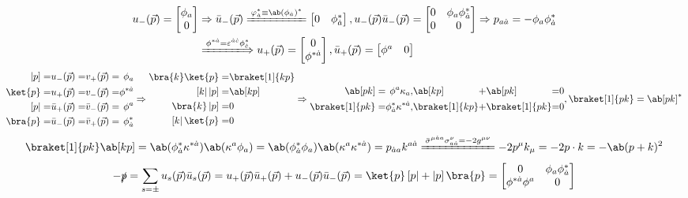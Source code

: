 \documentclass{article}
\newcommand{\bmat}[1]{\begin{bmatrix}#1\end{bmatrix}}
\newcommand{\gmunu}{g^{\mu\nu}}
\newcommand{\slashedp}{\slashed{p}}
\newcommand{\xleq}{\xlongequal}
\begin{document}
\begin{align*}
    u_{-}(\vec{p}) = \bmat{\phi_a                                                                                  \\ 0} & \Rightarrow \bar{u}_{-}(\vec{p}) \xleq{\varphi^*_{\dot{a}} \equiv \ab(\phi_{\dot{a}})^*} \bmat{0 & \phi^*_{\dot{a}}}, u_{-}(\vec{p}) \bar{u}_{-}(\vec{p}) = \bmat{0 & \phi_a \phi^*_{\dot{a}} \\ 0 & 0} \Rightarrow p_{a\dot{a}} = - \phi_a \phi^*_{\dot{a}} \\
     & \xLongrightarrow{\phi^{* \dot{a}} = \varepsilon^{\dot{a}\dot{c}} \phi^*_{\dot{c}}} u_{+}(\vec{p}) = \bmat{0 \\ \phi^{* \dot{a}}}, \bar{u}_{+}(\vec{p}) = \bmat{\phi^a & 0}
\end{align*}
\[ \begin{alignedat}{6}
        \left| p \right]& = & u_-(\vec{p}) &=& v_+(\vec{p}) &=& \phi_a             \\
        \ket{p} &=          & u_+(\vec{p}) &=& v_-(\vec{p}) &=& \phi^{* \dot{a}}            \\
        \left[ p \right| &= & \bar{u}_+(\vec{p})&=& \bar{v}_-(\vec{p})& = &\phi^a\\
        \bra{p} &=          & \bar{u}_-(\vec{p})&=& \bar{v}_+(\vec{p}) &=& \phi^*_{\dot{a}}
    \end{alignedat} \Rightarrow \begin{aligned}
        \bra{k} \ket{p} =                   & \braket[1]{k p} \\
        \left[ k \right| \left| p \right] = & \ab[k p]        \\
        \bra{k} \left| p \right] =          & 0               \\
        \left[ k \right| \ket{p}=           & 0
    \end{aligned} \Rightarrow \begin{alignedat}{7}
        \ab[p k] & = & \phi^a \kappa_a,                            & \ab[k p] &+& \ab[p k] &=& 0               \\
        \braket[1]{p k} &=& \phi^*_{\dot{a}} \kappa^{* \dot{a}}, & \braket[1]{k p} &+ &\braket[1]{p k} &=& 0
    \end{alignedat},  \braket[1]{p k} = \ab[p k]^* \]
\[ \braket[1]{p k} \ab[k p] = \ab(\phi^*_{\dot{a}} \kappa^{*\dot{a}}) \ab(\kappa^a \phi_a) = \ab(\phi^*_{\dot{a}} \phi_a) \ab(\kappa^a \kappa^{*\dot{a}}) = p_{\dot{a}a} k^{a\dot{a}} \xleq{\bar{\sigma}^{\mu\dot{a}a} \sigma^{\nu}_{a\dot{a}} = - 2 \gmunu} - 2 p^{\mu} k_{\mu} = - 2 p \cdot k = - \ab(p + k)^2 \]
\[ - \slashedp = \sum_{s = \pm}u_s(\vec{p})\bar{u}_s(\vec{p}) = u_+(\vec{p})\bar{u}_+(\vec{p}) + u_-(\vec{p})\bar{u}_-(\vec{p}) = \ket{p} \left[p\right| + \left|p\right]\bra{p} = \bmat{0 & \phi_a\phi^*_{\dot{a}} \\ \phi^{*\dot{a}}\phi^a & 0} \]
\end{document}
